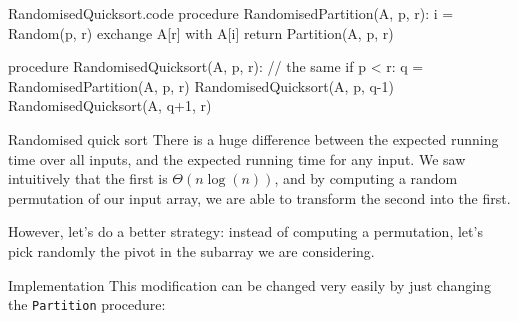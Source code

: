 \documentclass[a4paper]{article}
\begin{document}
\begin{filecontents*}[overwrite]{RandomisedQuicksort.code}
procedure RandomisedPartition(A, p, r):
    i = Random(p, r)
    exchange A[r] with A[i]
    return Partition(A, p, r)

procedure RandomisedQuicksort(A, p, r):  // the same
    if p < r:
        q = RandomisedPartition(A, p, r)
        RandomisedQuicksort(A, p, q-1)
        RandomisedQuicksort(A, q+1, r)
\end{filecontents*}

\begin{parag}{Randomised quick sort}
    There is a huge difference between the expected running time over all inputs, and the expected running time for any input. We saw intuitively that the first is $\Theta\left(n\log\left(n\right)\right)$, and by computing a random permutation of our input array, we are able to transform the second into the first. 

    However, let's do a better strategy: instead of computing a permutation, let's pick randomly the pivot in the subarray we are considering.

    \begin{subparag}{Implementation}
        This modification can be changed very easily by just changing the \texttt{Partition} procedure:
    \end{subparag}
\end{parag}
\end{document}

